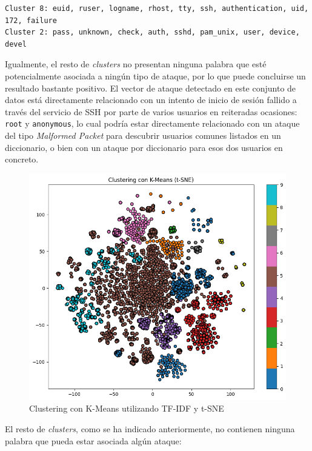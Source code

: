 \begin{center}
    \begin{mdframed}
    \footnotesize
            \begin{verbatim}
Cluster 8: euid, ruser, logname, rhost, tty, ssh, authentication, uid, 
172, failure
Cluster 2: pass, unknown, check, auth, sshd, pam_unix, user, device, devel
            \end{verbatim}
    \end{mdframed}
\end{center}
\newpage

Igualmente, el resto de \textit{clusters} no presentan ninguna palabra que esté potencialmente asociada a ningún tipo de ataque, por lo que puede concluirse un resultado bastante positivo. El vector de ataque detectado en este conjunto de datos está directamente relacionado con un intento de inicio de sesión fallido a través del servicio de \gls{SSH} por parte de varios usuarios en reiteradas ocasiones: \texttt{root} y \texttt{anonymous}, lo cual podría estar directamente relacionado con un ataque del tipo \textit{Malformed Packet} para descubrir usuarios comunes listados en un diccionario, o bien con un ataque por diccionario para esos dos usuarios en concreto.

\begin{figure}[H]
    \centering
    \includegraphics[width=0.7\linewidth]{imagenes/k-means-tf-idf-t-sne.png}
    \caption{Clustering con K-Means utilizando \gls{TF}-\gls{IDF} y \gls{t-SNE}}
    \label{fig:k-means-tf-idf-t-sne}
\end{figure}

\vspace{-3mm}

El resto de \textit{clusters}, como se ha indicado anteriormente, no contienen ninguna palabra que pueda estar asociada algún ataque:


